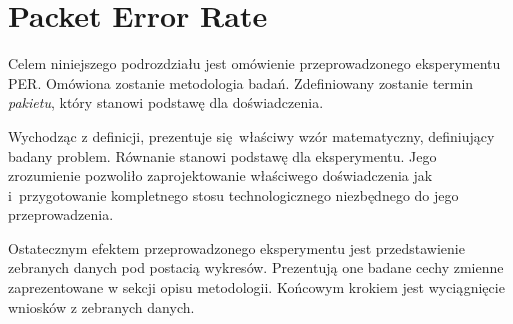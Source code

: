 

\section{Packet Error Rate}

Celem niniejszego podrozdziału jest omówienie przeprowadzonego eksperymentu \gls{PER}. Omówiona zostanie
metodologia badań. Zdefiniowany zostanie termin \textit{pakietu}, który stanowi podstawę dla
doświadczenia.

Wychodząc z definicji, prezentuje się właściwy wzór matematyczny, definiujący badany problem. Równanie
stanowi podstawę dla eksperymentu. Jego zrozumienie pozwoliło zaprojektowanie właściwego doświadczenia
jak i~przygotowanie kompletnego stosu technologicznego niezbędnego do jego przeprowadzenia.

Ostatecznym efektem przeprowadzonego eksperymentu jest przedstawienie zebranych danych pod postacią
wykresów. Prezentują one badane cechy zmienne zaprezentowane w sekcji opisu metodologii. Końcowym
krokiem jest wyciągnięcie wniosków z zebranych danych.
 

